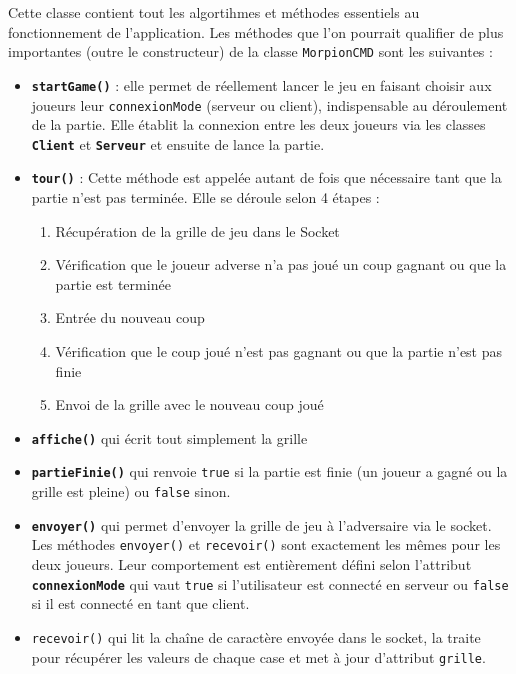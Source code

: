 \documentclass{report}
\begin{document}
Cette classe contient tout les algortihmes et méthodes essentiels au fonctionnement de l'application.
Les méthodes que l'on pourrait qualifier de plus importantes (outre le constructeur) de la classe \texttt{MorpionCMD} sont les suivantes :
\begin{itemize}
    \item \textbf{\texttt{startGame()}} : elle permet de réellement lancer le jeu en faisant choisir aux joueurs leur \texttt{connexionMode} (serveur ou client), indispensable au déroulement de la partie.
            Elle établit la connexion entre les deux joueurs via les classes \textbf{\texttt{Client}} et \textbf{\texttt{Serveur}} et ensuite de lance la partie.
    \item \textbf{\texttt{tour()}} : Cette méthode est appelée autant de fois que nécessaire tant que la partie n'est pas terminée. Elle se déroule selon 4 étapes :
            \begin{enumerate}
                \item Récupération de la grille de jeu dans le Socket
                \item Vérification que le joueur adverse n'a pas joué un coup gagnant ou que la partie est terminée 
                \item Entrée du nouveau coup 
                \item Vérification que le coup joué n'est pas gagnant ou que la partie n'est pas finie 
                \item Envoi de la grille avec le nouveau coup joué
            \end{enumerate}
    \item \textbf{\texttt{affiche()}} qui écrit tout simplement la grille 
    \item \textbf{\texttt{partieFinie()}} qui renvoie \texttt{true} si la partie est finie (un joueur a gagné ou la grille est pleine) ou \texttt{false} sinon.
    \item \textbf{\texttt{envoyer()}} qui permet d'envoyer la grille de jeu à l'adversaire via le socket. Les méthodes \texttt{envoyer()} et \texttt{recevoir()} sont exactement les mêmes pour les deux joueurs. Leur comportement est entièrement défini selon l'attribut \textbf{\texttt{connexionMode}} qui vaut \texttt{true} si l'utilisateur est connecté en serveur ou \texttt{false} si il est connecté en tant que client.
    \item \texttt{recevoir()} qui lit la chaîne de caractère envoyée dans le socket, la traite pour récupérer les valeurs de chaque case et met à jour d'attribut \texttt{grille}.
\end{itemize}
\end{document}
